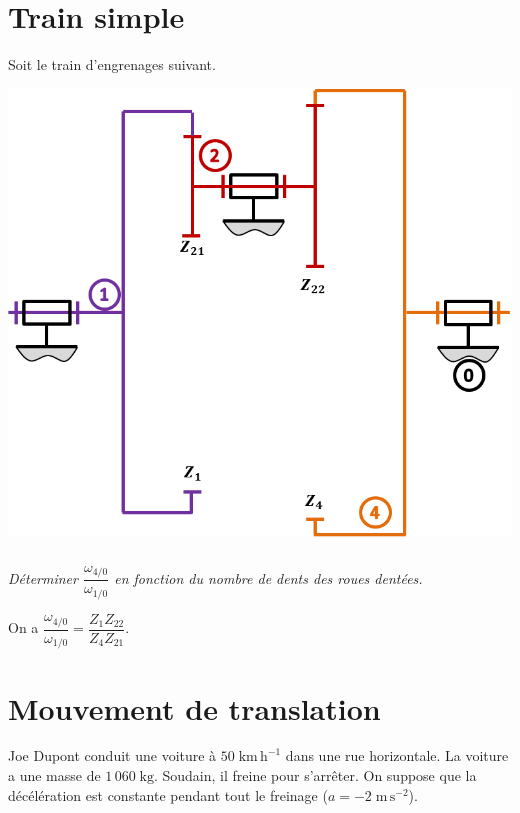 \documentclass[10pt,fleqn]{article} %
\begin{document}

\vspace{5.5cm}
\pagestyle{fancy}
\thispagestyle{plain}


\def\columnseprulecolor{\color{ocre}}
\setlength{\columnseprule}{0.4pt} 

\begin{multicols}{2}


\section*{Train simple}

Soit le train d'engrenages suivant. 
\begin{center}
\includegraphics[width=.7\linewidth]{images/TrainSimple_03}
\end{center}


\subparagraph{}
\textit{Déterminer $\dfrac{\omega_{4/0}}{\omega_{1/0}}$ en fonction du nombre de dents des roues dentées.}
\ifprof
\begin{corrige}
On a $\dfrac{\omega_{4/0}}{\omega_{1/0}}=\dfrac{Z_1Z_{22}}{Z_4Z_{21}}$.
\end{corrige}
\else



\section*{Mouvement de translation}
\setcounter{exo}{0}

Joe Dupont conduit une voiture à $50\; \text{km}\,\text{h}^{-1}$ dans une rue horizontale. La voiture a une masse de $1\,060\; \text{kg}$. Soudain, il freine pour s’arrêter.  On suppose que la décélération est constante pendant tout le freinage ($a = -2\; \text{m}\,\text{s}^{-2}$).


\end{multicols}
\end{document}
